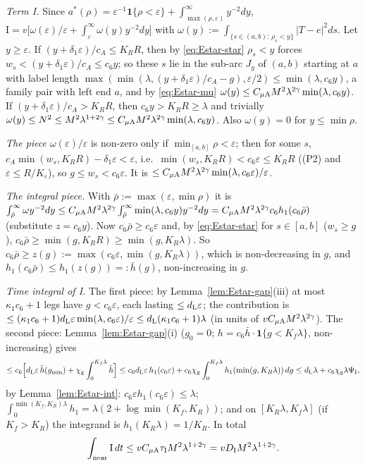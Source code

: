 \emph{Term \textup{I}.} Since $a^*(\rho)=\varepsilon^{-1}\mathbf 1\{\rho<\varepsilon\}+\int_{\max(\rho,\varepsilon)}^\infty y^{-2}dy$,
$\mathrm I=v\bigl[\omega(\varepsilon)/\varepsilon+\int_\varepsilon^\infty\omega(y)y^{-2}dy\bigr]$ with
$\omega(y):=\int_{\{s\in(a,b):\,\rho_s<y\}}|T-e|^2ds$. Let $y\ge\varepsilon$. If $(y+\delta_1\varepsilon)/c_A\le K_RR$, then by
\eqref{eq:Estar-star} $\rho_s<y$ forces $w_s<(y+\delta_1\varepsilon)/c_A\le c_6y$; so these $s$ lie in the sub-arc $J_y$ of $(a,b)$
starting at $a$ with label length $\max(\min(\lambda,(y+\delta_1\varepsilon)/c_A-g),\varepsilon/2)\le\min(\lambda,c_6y)$, a family
pair with left end $a$, and by \eqref{eq:Estar-mu} $\omega(y)\le C_{\mu\mathrm A} M^2\lambda^{2\gamma}\min(\lambda,c_6y)$. If
$(y+\delta_1\varepsilon)/c_A>K_RR$, then $c_6y>K_RR\ge\lambda$ and trivially
$\omega(y)\le N^2\le M^2\lambda^{1+2\gamma}\le C_{\mu\mathrm A} M^2\lambda^{2\gamma}\min(\lambda,c_6y)$. Also $\omega(y)=0$ for $y\le\min\rho$.

\emph{The piece $\omega(\varepsilon)/\varepsilon$} is non-zero only if $\min_{[a,b]}\rho<\varepsilon$; then for some $s$,
$c_A\min(w_s,K_RR)-\delta_1\varepsilon<\varepsilon$, i.e.\ $\min(w_s,K_RR)<c_6\varepsilon\le K_RR$ (\textup{(P2)} and
$\varepsilon\le R/K_\varepsilon$), so $g\le w_s<c_6\varepsilon$. It is $\le C_{\mu\mathrm A} M^2\lambda^{2\gamma}\min(\lambda,c_6\varepsilon)/\varepsilon$.

\emph{The integral piece.} With $\bar\rho:=\max(\varepsilon,\min\rho)$ it is
$\int_{\bar\rho}^\infty\omega y^{-2}dy\le C_{\mu\mathrm A} M^2\lambda^{2\gamma}\int_{\bar\rho}^\infty\min(\lambda,c_6y)y^{-2}dy
=C_{\mu\mathrm A} M^2\lambda^{2\gamma}c_6h_1(c_6\bar\rho)$ (substitute $z=c_6y$). Now $c_6\bar\rho\ge c_6\varepsilon$ and, by
\eqref{eq:Estar-star} for $s\in[a,b]$ ($w_s\ge g$), $c_6\bar\rho\ge\min(g,K_RR)\ge\min(g,K_R\lambda)$. So
$c_6\bar\rho\ge z(g):=\max(c_6\varepsilon,\min(g,K_R\lambda))$, which is non-decreasing in $g$, and
$h_1(c_6\bar\rho)\le h_1(z(g))=:\bar h(g)$, non-increasing in $g$.

\emph{Time integral of \textup{I}.} The first piece: by Lemma~\ref{lem:Estar-gap}(iii) at most $\kappa_1c_6+1$ legs have
$g<c_6\varepsilon$, each lasting $\le d_{\mathrm L}\varepsilon$; the contribution is
$\le(\kappa_1c_6+1)d_{\mathrm L}\varepsilon\min(\lambda,c_6\varepsilon)/\varepsilon\le d_{\mathrm L}(\kappa_1c_6+1)\lambda$ (in units of
$vC_{\mu\mathrm A} M^2\lambda^{2\gamma}$). The second piece: Lemma~\ref{lem:Estar-gap}(i) ($g_0=0$; $h=c_6\bar h\cdot\mathbf 1\{g<K_f\lambda\}$,
non-increasing) gives
\[
\le c_6\Bigl[d_{\mathrm L}\varepsilon\,\bar h(g_{\min})+\chi_{\mathrm g}\int_0^{K_f\lambda}\bar h\Bigr]
\le c_6d_{\mathrm L}\varepsilon\,h_1(c_6\varepsilon)+c_6\chi_{\mathrm g}\int_0^{K_f\lambda}h_1(\min(g,K_R\lambda))\,dg\le d_{\mathrm L}\lambda+c_6\chi_{\mathrm g}\lambda\Psi_{\mathrm I},
\]
by Lemma~\ref{lem:Estar-int}: $c_6\varepsilon h_1(c_6\varepsilon)\le\lambda$;
$\int_0^{\min(K_f,K_R)\lambda}h_1=\lambda(2+\log\min(K_f,K_R))$; and on $[K_R\lambda,K_f\lambda]$ (if $K_f>K_R$) the integrand is
$h_1(K_R\lambda)=1/K_R$. In total
\[
\int_{\mathrm{near}}\mathrm I\,dt\le vC_{\mu\mathrm A}\tau_{\mathrm I}M^2\lambda^{1+2\gamma}=vD_{\mathrm I} M^2\lambda^{1+2\gamma}.
\]

